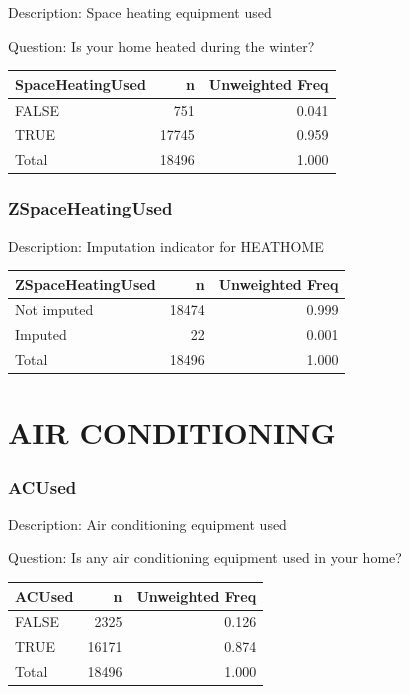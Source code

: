 \documentclass[
]{krantz}
\begin{document}
Description: Space heating equipment used

Question: Is your home heated during the winter?

\begin{tabular}[t]{l|r|r}
\hline
SpaceHeatingUsed & n & Unweighted Freq\\
\hline
FALSE & 751 & 0.041\\
\hline
TRUE & 17745 & 0.959\\
\hline
Total & 18496 & 1.000\\
\hline
\end{tabular}

\hypertarget{zspaceheatingused}{%
\subsubsection*{ZSpaceHeatingUsed}\label{zspaceheatingused}}


Description: Imputation indicator for HEATHOME

\begin{tabular}[t]{l|r|r}
\hline
ZSpaceHeatingUsed & n & Unweighted Freq\\
\hline
Not imputed & 18474 & 0.999\\
\hline
Imputed & 22 & 0.001\\
\hline
Total & 18496 & 1.000\\
\hline
\end{tabular}

\hypertarget{air-conditioning}{%
\section{AIR CONDITIONING}\label{air-conditioning}}

\hypertarget{acused}{%
\subsubsection*{ACUsed}\label{acused}}


Description: Air conditioning equipment used

Question: Is any air conditioning equipment used in your home?

\begin{tabular}[t]{l|r|r}
\hline
ACUsed & n & Unweighted Freq\\
\hline
FALSE & 2325 & 0.126\\
\hline
TRUE & 16171 & 0.874\\
\hline
Total & 18496 & 1.000\\
\hline
\end{tabular}
\end{document}
